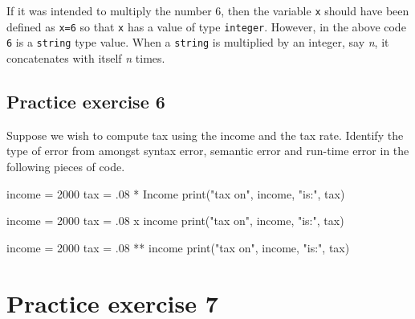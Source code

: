\documentclass[
  letterpaper,
  DIV=11,
  numbers=noendperiod]{scrreprt}
\newenvironment{Shaded}{\begin{snugshade}}{\end{snugshade}}
\newcommand{\BuiltInTok}[1]{\textcolor[rgb]{0.00,0.23,0.31}{#1}}
\newcommand{\DecValTok}[1]{\textcolor[rgb]{0.68,0.00,0.00}{#1}}
\newcommand{\FloatTok}[1]{\textcolor[rgb]{0.68,0.00,0.00}{#1}}
\newcommand{\NormalTok}[1]{\textcolor[rgb]{0.00,0.23,0.31}{#1}}
\newcommand{\OperatorTok}[1]{\textcolor[rgb]{0.37,0.37,0.37}{#1}}
\newcommand{\StringTok}[1]{\textcolor[rgb]{0.13,0.47,0.30}{#1}}
\begin{document}
If it was intended to multiply the number 6, then the variable
\texttt{x} should have been defined as \texttt{x=6} so that \texttt{x}
has a value of type \texttt{integer}. However, in the above code
\texttt{6} is a \texttt{string} type value. When a \texttt{string} is
multiplied by an integer, say \emph{n}, it concatenates with itself
\emph{n} times.

\hypertarget{practice-exercise-6}{%
\subsection{Practice exercise 6}\label{practice-exercise-6}}

Suppose we wish to compute tax using the income and the tax rate.
Identify the type of error from amongst syntax error, semantic error and
run-time error in the following pieces of code.

\begin{Shaded}
\begin{Highlighting}[]
\NormalTok{income }\OperatorTok{=} \DecValTok{2000}
\NormalTok{tax }\OperatorTok{=} \FloatTok{.08} \OperatorTok{*}\NormalTok{ Income}
\BuiltInTok{print}\NormalTok{(}\StringTok{"tax on"}\NormalTok{, income, }\StringTok{"is:"}\NormalTok{, tax)}
\end{Highlighting}
\end{Shaded}

\begin{Shaded}
\begin{Highlighting}[]
\NormalTok{income }\OperatorTok{=} \DecValTok{2000}
\NormalTok{tax }\OperatorTok{=} \FloatTok{.08}\NormalTok{ x income}
\BuiltInTok{print}\NormalTok{(}\StringTok{"tax on"}\NormalTok{, income, }\StringTok{"is:"}\NormalTok{, tax)}
\end{Highlighting}
\end{Shaded}

\begin{Shaded}
\begin{Highlighting}[]
\NormalTok{income }\OperatorTok{=} \DecValTok{2000}
\NormalTok{tax }\OperatorTok{=} \FloatTok{.08} \OperatorTok{**}\NormalTok{ income}
\BuiltInTok{print}\NormalTok{(}\StringTok{"tax on"}\NormalTok{, income, }\StringTok{"is:"}\NormalTok{, tax)}
\end{Highlighting}
\end{Shaded}

\hypertarget{practice-exercise-7}{%
\section{Practice exercise 7}\label{practice-exercise-7}}
\end{document}

